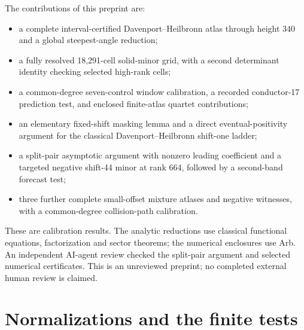 \documentclass[11pt]{article}
\theoremstyle{remark}
\begin{document}
The contributions of this preprint are:
\begin{itemize}
\item a complete interval-certified Davenport--Heilbronn atlas through height
340 and a global steepest-angle reduction;
\item a fully resolved 18,291-cell solid-minor grid, with a second determinant
identity checking selected high-rank cells;
\item a common-degree seven-control window calibration, a recorded
conductor-17 prediction test, and enclosed finite-atlas quartet contributions;
\item an elementary fixed-shift masking lemma and a direct eventual-positivity
argument for the classical Davenport--Heilbronn shift-one ladder;
\item a split-pair asymptotic argument with nonzero leading coefficient and
a targeted negative shift-44 minor at rank 664, followed by a second-band
forecast test;
\item three further complete small-offset mixture atlases and negative
witnesses, with a common-degree collision-path calibration.
\end{itemize}
These are calibration results. The analytic reductions use classical
functional equations, factorization and sector theorems; the numerical
enclosures use Arb. An independent AI-agent review checked the split-pair argument and selected
numerical certificates. This is an unreviewed preprint; no completed external
human review is claimed.

\section{Normalizations and the finite tests}\label{sec:normalization}
\end{document}

